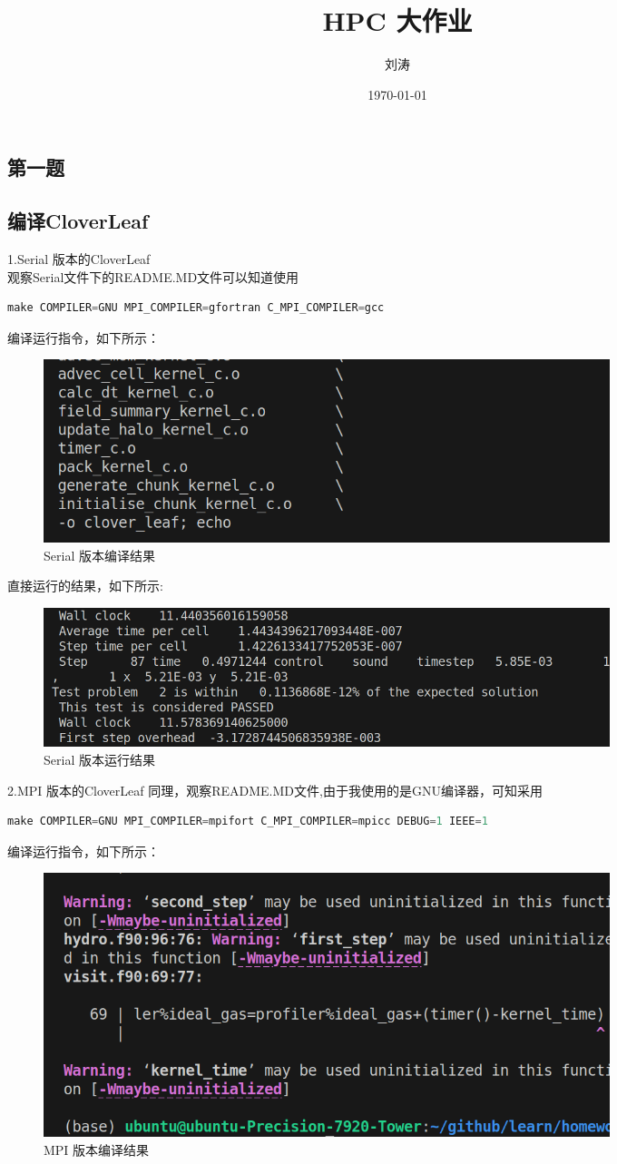 \documentclass{article}
\begin{document}
\begin{CJK}{UTF8}{gbsn}
\title{HPC 大作业}
\author{刘涛}
\date{\today}

\maketitle

\section{第一题}
\subsection{编译CloverLeaf}
1.Serial 版本的CloverLeaf\\
观察Serial文件下的README.MD文件可以知道使用
\begin{lstlisting}[language=C++]
    make COMPILER=GNU MPI_COMPILER=gfortran C_MPI_COMPILER=gcc
\end{lstlisting} 
编译运行指令，如下所示：
\begin{figure}[H]
    \centering
    \includegraphics[width=0.8\textwidth]{./serial2.png}
    \caption{Serial 版本编译结果}
\end{figure} 

直接运行的结果，如下所示:
\begin{figure}[H]
    \centering
    \includegraphics[width=0.8\textwidth]{./serial1.png}
    \caption{Serial 版本运行结果}
\end{figure} 

2.MPI 版本的CloverLeaf
同理，观察README.MD文件,由于我使用的是GNU编译器，可知采用
\begin{lstlisting}[language=C++]
make COMPILER=GNU MPI_COMPILER=mpifort C_MPI_COMPILER=mpicc DEBUG=1 IEEE=1
\end{lstlisting} 
编译运行指令，如下所示：
\begin{figure}[H]
    \centering
    \includegraphics[width=0.8\textwidth]{./MPI1.png}
    \caption{MPI 版本编译结果}
\end{figure} 


\end{CJK}
\end{document}
